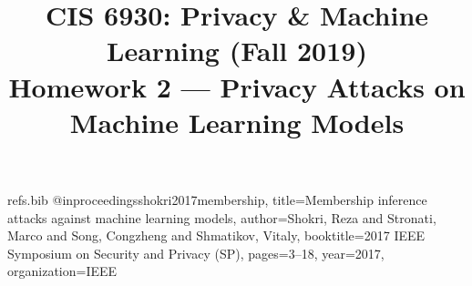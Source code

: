 \begin{filecontents}{refs.bib}
@inproceedings{shokri2017membership,
  title={Membership inference attacks against machine learning models},
  author={Shokri, Reza and Stronati, Marco and Song, Congzheng and Shmatikov, Vitaly},
  booktitle={2017 IEEE Symposium on Security and Privacy (SP)},
  pages={3--18},
  year={2017},
  organization={IEEE}
}
\end{filecontents}

\documentclass[11pt,letterpaper]{article}

\usepackage[letterpaper,margin=0.8in,nohead]{geometry}

\usepackage[colorlinks]{hyperref}
\usepackage{url}
\usepackage{breakurl}


\usepackage{verbatim}
\usepackage{fancyvrb}
\usepackage{scrextend}
\usepackage{enumitem}
\usepackage{url}

\usepackage{filecontents}

\usepackage{caption}
\usepackage{graphicx}

\usepackage{changepage}   %

\newenvironment{answer}{\em \color{blue} \begin{adjustwidth}{1cm}{1cm}}{\end{adjustwidth}}

\usepackage{amsthm,amsmath}
\usepackage{amsfonts}

\newcommand{\mc}[1]{\mathcal{#1}}	%
\newcommand{\rv}[1]{\mathbf{#1}}    %

\newcommand{\pr}[1]{\mathrm{Pr}\{#1\}} %

\newtheorem{corollary}{\bf Corollary}%
\newtheorem{lemma}{\bf Lemma}%
\newtheorem{definition}{\bf Definition}%

\newtheorem{observation}{\bf Observation}%



\usepackage[capitalise]{cleveref}





\title{CIS 6930: Privacy \& Machine Learning (Fall 2019) \\Homework 2 --- Privacy Attacks on Machine Learning Models}

